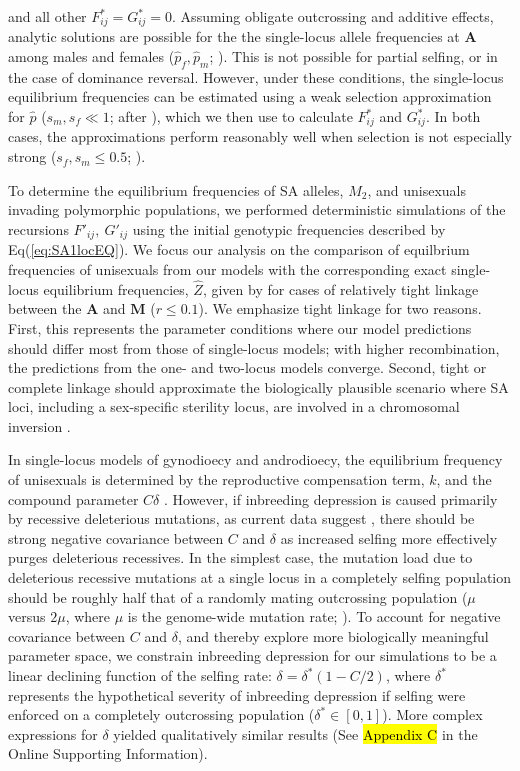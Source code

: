 \documentclass[9pt,twocolumn,twoside,lineno]{gsajnl}
\begin{document}
\noindent and all other $F^{\ast}_{ij} = G^{\ast}_{ij} =0$. Assuming obligate outcrossing and additive effects, analytic solutions are possible for the the single-locus allele frequencies at $\mathbf{A}$ among males and females ($\hat{p}_f,\hat{p}_m$; \citealt{Kidwell1977}). This is not possible for partial selfing, or in the case of dominance reversal. However, under these conditions, the single-locus equilibrium frequencies can be estimated using a weak selection approximation for $\hat{p}$ ($s_m,s_f \ll 1$; after \citealt{JordanConnallon2014}), which we then use to calculate $F^{\ast}_{ij}$ and $G^{\ast}_{ij}$. In both cases, the approximations perform reasonably well when selection is not especially strong ($s_f,s_m \leq 0.5$; \citealt{JordanConnallon2014,Olito2017}). 

To determine the equilibrium frequencies of SA alleles, $M_2$, and unisexuals invading polymorphic populations, we performed deterministic simulations of the recursions $F'_{ij},~G'_{ij}$ using the initial genotypic frequencies described by Eq(\ref{eq:SA1locEQ}). We focus our analysis on the comparison of equilbrium frequencies of unisexuals from our models with the corresponding exact single-locus equilibrium frequencies, $\hat{Z}$, given by \citet{Charlesworth1978a} for cases of relatively tight linkage between the $\mathbf{A}$ and $\mathbf{M}$ ($r\leq 0.1$). We emphasize tight linkage for two reasons. First, this represents the parameter conditions where our model predictions should differ most from those of single-locus models; with higher recombination, the predictions from the one- and two-locus models converge. Second, tight or complete linkage should approximate the biologically plausible scenario where SA loci, including a sex-specific sterility locus, are involved in a chromosomal inversion \citep{LeeKelly2015}.

In single-locus models of gynodioecy and androdioecy, the equilibrium frequency of unisexuals is determined by the reproductive compensation term, $k$, and the compound parameter $C \delta$ \citep{Charlesworth1978a}. However, if inbreeding depression is caused primarily by recessive deleterious mutations, as current data suggest \citep{Charlesworth2009}, there should be strong negative covariance between $C$ and $\delta$ as increased selfing more effectively purges deleterious recessives. In the simplest case, the mutation load due to deleterious recessive mutations at a single locus in a completely selfing population should be roughly half that of a randomly mating outcrossing population ($\mu$ versus $2 \mu$, where $\mu$ is the genome-wide mutation rate; \citealt{OhtaCockerham1974}). To account for negative covariance between $C$ and $\delta$, and thereby explore more biologically meaningful parameter space, we constrain inbreeding depression for our simulations to be a linear declining function of the selfing rate: $\delta = \delta^\ast(1 - C/2)$, where $\delta^\ast$ represents the hypothetical severity of inbreeding depression if selfing were enforced on a completely outcrossing population ($\delta^\ast \in [0,1]$). More complex expressions for $\delta$ yielded qualitatively similar results (See \hl{Appendix C} in the Online Supporting Information). 
\end{document}

